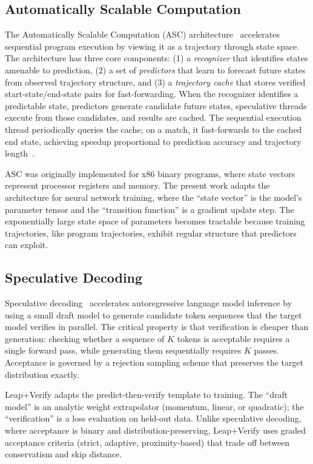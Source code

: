 \documentclass{article}
\begin{document}
\subsection{Automatically Scalable Computation}

The Automatically Scalable Computation (ASC) architecture~\citep{waterland2014asc,waterland2013computational} accelerates sequential program execution by viewing it as a trajectory through state space.
The architecture has three core components: (1) a \emph{recognizer} that identifies states amenable to prediction, (2) a set of \emph{predictors} that learn to forecast future states from observed trajectory structure, and (3) a \emph{trajectory cache} that stores verified start-state/end-state pairs for fast-forwarding.
When the recognizer identifies a predictable state, predictors generate candidate future states, speculative threads execute from those candidates, and results are cached.
The sequential execution thread periodically queries the cache; on a match, it fast-forwards to the cached end state, achieving speedup proportional to prediction accuracy and trajectory length~\citep{waterland2014asc}.

ASC was originally implemented for x86 binary programs, where state vectors represent processor registers and memory.
The present work adapts the architecture for neural network training, where the ``state vector'' is the model's parameter tensor and the ``transition function'' is a gradient update step.
The exponentially large state space of parameters becomes tractable because training trajectories, like program trajectories, exhibit regular structure that predictors can exploit.

\subsection{Speculative Decoding}

Speculative decoding~\citep{leviathan2023fast,chen2023accelerating,stern2018blockwise} accelerates autoregressive language model inference by using a small draft model to generate candidate token sequences that the target model verifies in parallel.
The critical property is that verification is cheaper than generation: checking whether a sequence of $K$ tokens is acceptable requires a single forward pass, while generating them sequentially requires $K$ passes.
Acceptance is governed by a rejection sampling scheme that preserves the target distribution exactly.

Leap+Verify adapts the predict-then-verify template to training.
The ``draft model'' is an analytic weight extrapolator (momentum, linear, or quadratic); the ``verification'' is a loss evaluation on held-out data.
Unlike speculative decoding, where acceptance is binary and distribution-preserving, Leap+Verify uses graded acceptance criteria (strict, adaptive, proximity-based) that trade off between conservatism and skip distance.
\end{document}
